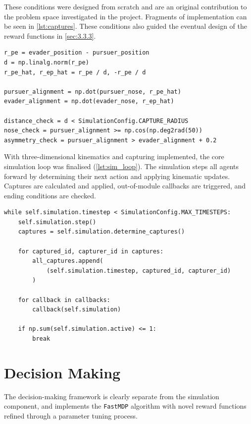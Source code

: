 These conditions were designed from scratch and are an original contribution to the problem space investigated in the project. Fragments of implementation can be seen in \cref{lst:captures}. These conditions also guided the eventual design of the reward functions in \cref{sec:3.3.3}.

\begin{listing}[H]
\begin{verbatim}
r_pe = evader_position - pursuer_position
d = np.linalg.norm(r_pe)
r_pe_hat, r_ep_hat = r_pe / d, -r_pe / d

pursuer_alignment = np.dot(pursuer_nose, r_pe_hat)
evader_alignment = np.dot(evader_nose, r_ep_hat)

distance_check = d < SimulationConfig.CAPTURE_RADIUS
nose_check = pursuer_alignment >= np.cos(np.deg2rad(50))
asymmetry_check = pursuer_alignment > evader_alignment + 0.2
\end{verbatim}
\caption{Capture condition values and comparisons}
\label{lst:captures}
\end{listing}

With three-dimensional kinematics and capturing implemented, the core simulation loop was finalised (\cref{lst:sim_loop}). The simulation steps all agents forward by determining their next action and applying kinematic updates. Captures are calculated and applied, out-of-module callbacks are triggered, and ending conditions are checked.

\begin{listing}[H]
\begin{verbatim}
while self.simulation.timestep < SimulationConfig.MAX_TIMESTEPS:
    self.simulation.step()
    captures = self.simulation.determine_captures()

    for captured_id, capturer_id in captures:
        all_captures.append(
            (self.simulation.timestep, captured_id, capturer_id)
        )

    for callback in callbacks:
        callback(self.simulation)

    if np.sum(self.simulation.active) <= 1:
        break
\end{verbatim}
\caption{Simulation loop with capture-breaking logic and per-timestep callbacks}
\label{lst:sim_loop}
\end{listing}

\section{Decision Making}
\label{sec:3.3}
The decision-making framework is clearly separate from the simulation component, and implements the \texttt{FastMDP} algorithm with novel reward functions refined through a parameter tuning process.

